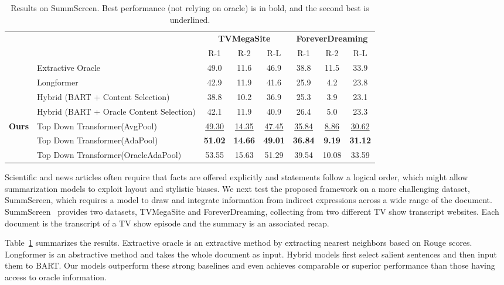 \documentclass{article} \usepackage{iclr2022_conference,times}
\newcommand{\todof}{{Top Down Transformer}\xspace} \newcommand{\todofull}{{Top Down Transformer}\xspace} \newcommand\todo[1]{\textcolor{red}{(#1)}}
\begin{document}
\begin{table}[h!]
\small
\centering
\begin{tabular}{c l c c c c c c} 
\toprule
& & \multicolumn{3}{c}{\textbf{TVMegaSite}} & \multicolumn{3}{c}{\textbf{ForeverDreaming}}\\
& & R-1 & R-2 & R-L & R-1 & R-2 & R-L \\
\hline
& Extractive Oracle & 49.0 & 11.6 & 46.9 & 38.8 & 11.5 & 33.9 \\ \cline{2-8} 
& Longformer & 42.9 & 11.9 & 41.6 & 25.9 & 4.2 & 23.8 \\ 
& Hybrid (BART + Content Selection) & 38.8 &10.2 & 36.9 & 25.3 & 3.9 & 23.1 \\
& Hybrid (BART + Oracle Content Selection) & 42.1 & 11.9 & 40.9 & 26.4 & 5.0 & 23.3 \\
\hline
\multirow{3}{*}{\bf Ours} & \todof (AvgPool) & \underline{49.30} & \underline{14.35} & \underline{47.45} & \underline{35.84} & \underline{8.86} & \underline{30.62} \\ 
    & \todof (AdaPool) & \textbf{51.02} & \textbf{14.66} & \textbf{49.01} & \textbf{36.84} & \textbf{9.19} & \textbf{31.12} \\ \cline{2-8}
    & \todof (OracleAdaPool) & 53.55 & 15.63 & 51.29 & 39.54 & 10.08 & 33.59 \\ 
\hline
\end{tabular}
\caption{\scriptsize Results on SummScreen. Best performance (not relying on oracle) is in bold, and the second best is underlined.}
\label{table:summ-screen}
\end{table}


Scientific and news articles often require that facts are offered explicitly and statements follow a logical order, which might allow summarization models to exploit layout and stylistic biases. We next test the proposed framework on a more challenging dataset, SummScreen, which requires a model to draw and integrate information from indirect expressions across a wide range of the document. SummScreen~\citep{chen2021summscreen} provides two datasets, TVMegaSite and ForeverDreaming, collecting from two different TV show transcript websites. Each document is the transcript of a TV show episode and the summary is an associated recap.

Table~\ref{table:summ-screen} summarizes the results. Extractive oracle is an extractive method by extracting nearest neighbors based on Rouge scores. Longformer is an abstractive method and takes the whole document as input. Hybrid models first select salient sentences and then input them to BART. Our models outperform these strong baselines and even achieves comparable or superior performance than those having access to oracle information.
\end{document}

